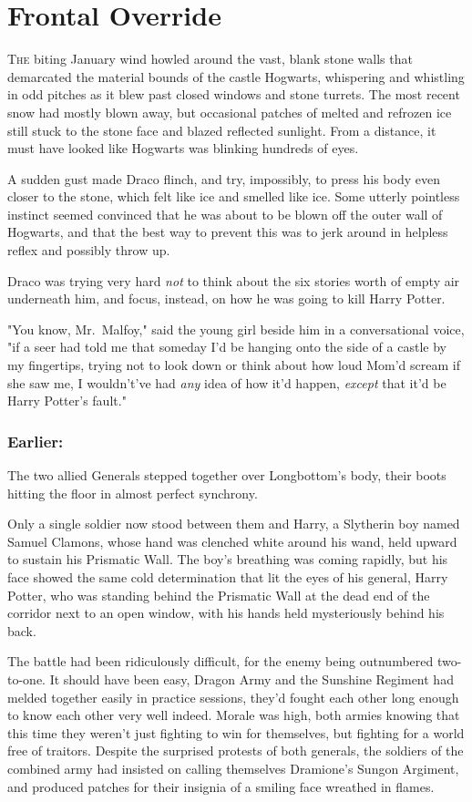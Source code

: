 \chapter{Frontal Override}

\lettrine{T}{he} biting
January wind howled around the vast, blank stone walls that demarcated the
material bounds of the castle Hogwarts, whispering and whistling in odd pitches
as it blew past closed windows and stone turrets. The most recent snow had
mostly blown away, but occasional patches of melted and refrozen ice still
stuck to the stone face and blazed reflected sunlight. From a distance, it must
have looked like Hogwarts was blinking hundreds of eyes.

A sudden gust made Draco flinch, and try, impossibly, to press his body even
closer to the stone, which felt like ice and smelled like ice. Some utterly
pointless instinct seemed convinced that he was about to be blown off the outer
wall of Hogwarts, and that the best way to prevent this was to jerk around in
helpless reflex and possibly throw up.

Draco was trying very hard \emph{not} to think about the six stories worth of
empty air underneath him, and focus, instead, on how he was going to kill Harry
Potter.

"You know, Mr.~Malfoy," said the young girl beside him in a conversational
voice, "if a seer had told me that someday I'd be hanging onto the side of a
castle by my fingertips, trying not to look down or think about how loud Mom'd
scream if she saw me, I wouldn't've had \emph{any} idea of how it'd happen,
\emph{except} that it'd be Harry Potter's fault."
\sbreak
\subsection{Earlier:}

The two allied Generals stepped together over Longbottom's body, their boots
hitting the floor in almost perfect synchrony.

Only a single soldier now stood between them and Harry, a Slytherin boy named
Samuel Clamons, whose hand was clenched white around his wand, held upward to
sustain his Prismatic Wall. The boy's breathing was coming rapidly, but his
face showed the same cold determination that lit the eyes of his general, Harry
Potter, who was standing behind the Prismatic Wall at the dead end of the
corridor next to an open window, with his hands held mysteriously behind his
back.

The battle had been ridiculously difficult, for the enemy being outnumbered
two-to-one. It should have been easy, Dragon Army and the Sunshine Regiment had
melded together easily in practice sessions, they'd fought each other long
enough to know each other very well indeed. Morale was high, both armies
knowing that this time they weren't just fighting to win for themselves, but
fighting for a world free of traitors. Despite the surprised protests of both
generals, the soldiers of the combined army had insisted on calling themselves
Dramione's Sungon Argiment, and produced patches for their insignia of a
smiling face wreathed in flames.

